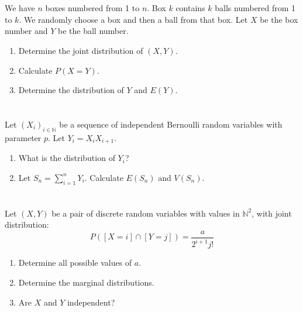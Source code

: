 \documentclass[12pt]{article}
\begin{document}
\begin{correctionbox}

\end{correctionbox}


\section{}
We have \( n \) boxes numbered from 1 to \( n \). Box \( k \) contains \( k \) balls numbered from 1 to \( k \). We randomly choose a box and then a ball from that box. Let \( X \) be the box number and \( Y \) be the ball number.
\begin{enumerate}
    \item Determine the joint distribution of \( (X, Y) \).
    \item Calculate \( P(X = Y) \).
    \item Determine the distribution of \( Y \) and \( E(Y) \).
\end{enumerate}

\begin{correctionbox}

\end{correctionbox}

\section{}
Let \( (X_i)_{i \in \mathbb{N}} \) be a sequence of independent Bernoulli random variables with parameter \( p \). Let \( Y_i = X_i X_{i+1} \).
\begin{enumerate}
    \item What is the distribution of \( Y_i \)?
    \item Let \( S_n = \sum_{i=1}^n Y_i \). Calculate \( E(S_n) \) and \( V(S_n) \).
\end{enumerate}

\begin{correctionbox}
    
\end{correctionbox}

\section{}
Let \( (X, Y) \) be a pair of discrete random variables with values in \( \mathbb{N}^2 \), with joint distribution:
\[
P([X = i] \cap [Y = j]) = \frac{a}{2^{i+1}j!}
\]
\begin{enumerate}
    \item Determine all possible values of \( a \).
    \item Determine the marginal distributions.
    \item Are \( X \) and \( Y \) independent?
\end{enumerate}
\end{document}
